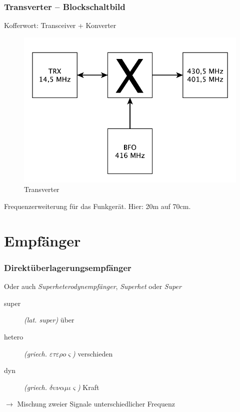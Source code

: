 \begin{frame}
  \frametitle{Transverter -- Blockschaltbild}
  Kofferwort: Transceiver + Konverter
  \begin{center}
    \begin{figure}
      \includegraphics[width=1\textwidth,height=.6\textheight,keepaspectratio]{e15/transverter.pdf}
      \caption{Transverter}
    \end{figure}
  \end{center}
  Frequenzerweiterung für das Funkgerät. Hier: 20m auf 70cm.
\end{frame}

\section*{Empfänger}

\begin{frame}
  \frametitle{Direktüberlagerungsempfänger}
  Oder auch \emph{Superheterodynempfänger}, \emph{Superhet} oder \emph{Super}
  \begin{description}
    \item[super] \textit{(lat. super)} über
    \item[hetero] \textit{(griech. $\varepsilon\tau\varepsilon\rho o\varsigma$)} verschieden
    \item[dyn] \textit{(griech. $\delta\upsilon\nu\alpha\mu\iota\varsigma$)} Kraft
  \end{description}
  $\rightarrow$ Mischung zweier Signale unterschiedlicher Frequenz
\end{frame}

